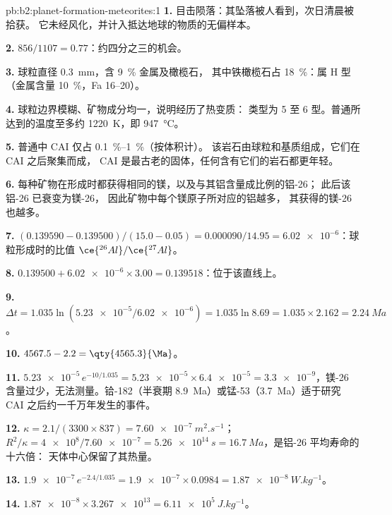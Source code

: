 \begin{solution}{pb:b2:planet-formation-meteorites:1}
\textbf{1.} 目击陨落：其坠落被人看到，次日清晨被拾获。
它未经风化，并计入抵达地球的物质的无偏样本。

\textbf{2.} $856/1107 = 0.77$：约四分之三的机会。

\textbf{3.} 球粒直径 \qty{0.3}{mm}，含 \qty{9}{\percent} 金属及橄榄石，
其中铁橄榄石占 \qty{18}{\percent}：属 H 型（金属含量 \qty{10}{\percent}，Fa 16--20）。

\textbf{4.} 球粒边界模糊、矿物成分均一，说明经历了热变质：
类型为 5 至 6 型。普通所达到的温度至多约 \qty{1220}{K}，即
\qty{947}{\degreeCelsius}。

\textbf{5.} 普通中 CAI 仅占 \qtyrange{0.1}{1}{\percent}（按体积计）。
该岩石由球粒和基质组成，它们在 CAI 之后聚集而成，
CAI 是最古老的固体，任何含有它们的岩石都更年轻。

\textbf{6.} 每种矿物在形成时都获得相同的镁，以及与其铝含量成比例的铝-26；
此后该铝-26 已衰变为镁-26，
因此矿物中每个镁原子所对应的铝越多，
其获得的镁-26 也越多。

\textbf{7.} $(0.139590 - 0.139500)/(15.0 - 0.05) = \num{0.000090}/14.95 =
\num{6.02e-6}$：球粒形成时的比值 
$\ce{^{26}Al}/\ce{^{27}Al}$。

\textbf{8.} $0.139500 + \num{6.02e-6}\times3.00 = 0.139518$：位于该直线上。

\textbf{9.} $\Delta t = 1.035\ln(\num{5.23e-5}/\num{6.02e-6}) = 1.035\ln8.69 =
1.035\times2.162 = \qty{2.24}{Ma}$。

\textbf{10.} $4567.5 - 2.2 = \qty{4565.3}{\Ma}$。

\textbf{11.} $\num{5.23e-5}\,e^{-10/1.035} = \num{5.23e-5}\times\num{6.4e-5} =
\num{3.3e-9}$，镁-26 含量过少，无法测量。铪-182（半衰期
\qty{8.9}{Ma}）或锰-53（\qty{3.7}{Ma}）适于研究
CAI 之后约一千万年发生的事件。

\textbf{12.} $\kappa = 2.1/(3300\times837) = \qty{7.60e-7}{m^2.s^{-1}}$；
$R^2/\kappa = \num{4e8}/\num{7.60e-7} = \qty{5.26e14}{s} = \qty{16.7}{Ma}$，是铝-26 平均寿命的十六倍：
天体中心保留了其热量。

\textbf{13.} $\num{1.9e-7}\,e^{-2.4/1.035} = \num{1.9e-7}\times0.0984 =
\qty{1.87e-8}{W.kg^{-1}}$。

\textbf{14.} $\num{1.87e-8}\times\num{3.267e13} = \qty{6.11e5}{J.kg^{-1}}$。


\end{solution}
